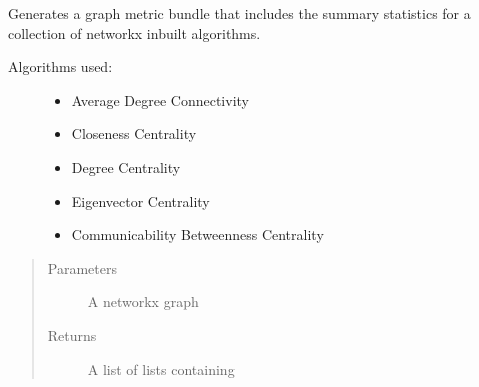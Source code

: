 \documentclass[letterpaper,10pt,english]{sphinxmanual}
\begin{document}

\begin{fulllineitems}
\label{\detokenize{source/yawning_titan.experiment_helpers:yawning_titan.experiment_helpers.graph_metrics.get_graph_metric_bundle}}
\sphinxAtStartPar
Generates a graph metric bundle that includes the summary statistics
for a collection of networkx in\sphinxhyphen{}built algorithms.
\begin{description}
\item[{Algorithms used:}] \leavevmode\begin{itemize}
\item {}
\sphinxAtStartPar
Average Degree Connectivity

\item {}
\sphinxAtStartPar
Closeness Centrality

\item {}
\sphinxAtStartPar
Degree Centrality

\item {}
\sphinxAtStartPar
Eigenvector Centrality

\item {}
\sphinxAtStartPar
Communicability Between\sphinxhyphen{}ness Centrality

\end{itemize}

\end{description}
\begin{quote}\begin{description}
\item[{Parameters}] \leavevmode
\sphinxAtStartPar
{} \textendash{} A networkx graph

\item[{Returns}] \leavevmode
\sphinxAtStartPar
A list of lists containing

\end{description}\end{quote}

\end{fulllineitems}
\end{document}
